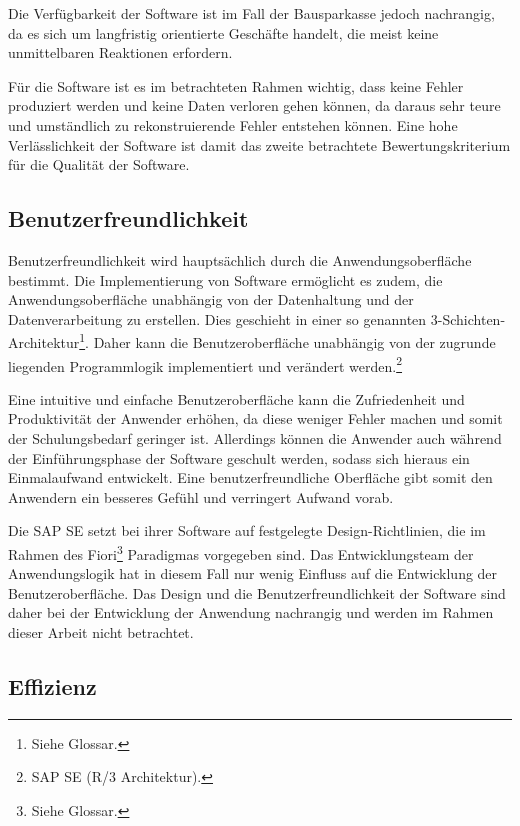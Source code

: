             Die Verfügbarkeit der Software ist im Fall der Bausparkasse jedoch nachrangig, da es sich um langfristig orientierte Geschäfte handelt, die meist keine unmittelbaren Reaktionen erfordern.

            Für die Software ist es im betrachteten Rahmen wichtig, dass keine Fehler produziert werden und keine Daten verloren gehen können, da daraus sehr teure und umständlich zu rekonstruierende Fehler entstehen können. Eine hohe Verlässlichkeit der Software ist damit das zweite betrachtete Bewertungskriterium für die Qualität der Software.

        \subsection{Benutzerfreundlichkeit}

            Benutzerfreundlichkeit wird hauptsächlich durch die Anwendungsoberfläche bestimmt. Die Implementierung von Software ermöglicht es zudem, die Anwendungsoberfläche unabhängig von der Datenhaltung und der Datenverarbeitung zu erstellen. Dies geschieht in einer so genannten 3-Schichten-Architektur\footnote{Siehe Glossar.}. Daher kann die Benutzeroberfläche unabhängig von der zugrunde liegenden Programmlogik implementiert und verändert werden.\footnote{SAP SE (R/3 Architektur).}

            Eine intuitive und einfache Benutzeroberfläche kann die Zufriedenheit und Produktivität der Anwender erhöhen, da diese weniger Fehler machen und somit der Schulungsbedarf geringer ist. Allerdings können die Anwender auch während der Einführungsphase der Software geschult werden, sodass sich hieraus ein Einmalaufwand entwickelt. Eine benutzerfreundliche Oberfläche gibt somit den Anwendern ein besseres Gefühl und verringert Aufwand vorab.

            Die SAP SE setzt bei ihrer Software auf festgelegte Design-Richtlinien, die im Rahmen des Fiori\footnote{Siehe Glossar.} Paradigmas vorgegeben sind. Das Entwicklungsteam der Anwendungslogik hat in diesem Fall nur wenig Einfluss auf die Entwicklung der Benutzeroberfläche. Das Design und die Benutzerfreundlichkeit der Software sind daher bei der Entwicklung der Anwendung nachrangig und werden im Rahmen dieser Arbeit nicht betrachtet.

        \subsection{Effizienz}

